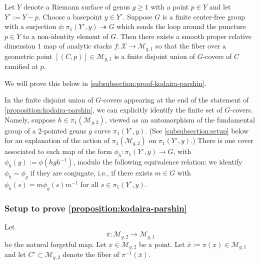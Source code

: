 \begin{proposition}
\notready
	\label{proposition:kodaira-parshin}
	Let $Y$ denote a Riemann surface of genus $g\geq 1$ with a point $p \in Y$ and
	let $Y^{\circ} := Y - p$. Choose a basepoint $y \in Y^{\circ}$.
	Suppose $G$ is a finite center-free group with a surjection
	$\phi: \pi_1(Y^{\circ},y) \twoheadrightarrow G$ which sends the loop around the puncture $p \in Y$ to
	a non-identity element of $G$.
	Then there exists a smooth proper relative dimension $1$ map of
	analytic stacks $f: \mathscr{X} \to
	\mathscr{M}_{g,1}$ so that the fiber over a geometric point $[(C,p)] \in
	\mathscr{M}_{g,1}$ is a finite disjoint union of $G$-covers of $C$
	ramified at $p$.
\end{proposition}
We will prove this below in \autoref{subsubsection:proof-kodaira-parshin}.
\begin{remark}
\notready
	\label{remark:}
	In the finite disjoint union of $G$-covers appearing at the end of the
	statement of \autoref{proposition:kodaira-parshin},
	we can explicitly identify the finite set of $G$-covers.
	Namely, suppose $h \in \pi_1(\mathscr M_{g,2})$, viewed as an
	automorphism of the fundamental group of a $2$-pointed genus $g$ curve $\pi_1(Y^{\circ},y)$. (See \autoref{subsubsection:setup} below for an explanation of the action of $\pi_1(\mathscr{M}_{g,2})$ on $\pi_1(Y^\circ, y)$.)
	There is one cover associated to each map
	of the form $\phi_h: \pi_1(Y^{\circ},y) \to G$, with $\phi_h(g) :=
	\phi(hgh^{-1})$,
	modulo the following equivalence relation:
	we identify $\phi_h \sim \phi_{g}$ if they
	are conjugate, i.e., if there exists $m \in G$ with $\phi_h(s) = m
	\phi_g(s)m^{-1}$ for all $s \in \pi_1(Y^{\circ},y)$.
\end{remark}


\subsubsection{Setup to prove \autoref{proposition:kodaira-parshin}}
\label{subsubsection:setup}
Let $$\pi:\mathscr{M}_{g, 2}\to \mathscr{M}_{g,1}$$ be the natural forgetful map.
Let $x\in \mathscr{M}_{g,2}$ be a point. Let $\bar{x} := \pi(x) \in
\mathscr{M}_{g,1}$ and let $C^\circ\subset \mathscr{M}_{g,2}$
denote the fiber of $\pi^{-1}(\bar{x})$.

